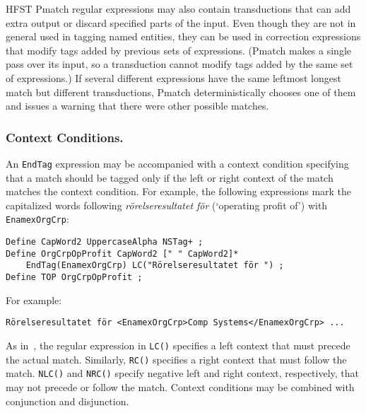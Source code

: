 \documentclass{llncs}
\begin{document}
HFST Pmatch regular expressions may also contain transductions that can add
extra output or discard specified parts of the input. Even though they
are not in general used in tagging named entities, they can be
used in correction expressions that modify tags added by previous sets
of expressions. (Pmatch makes a single pass over its input, so a
transduction cannot modify tags added by the same set of expressions.)
If several different expressions have the same leftmost longest match
but different transductions, Pmatch deterministically chooses one of
them and issues a warning that there were other possible matches.

\subsubsection{Context Conditions.}

An \texttt{EndTag} expression may be accompanied with a context
condition specifying that a match should be tagged only if the
left or right context of the match matches the context condition. For
example, the
following expressions mark the capitalized words following
\textit{rörelseresultatet för} (`operating profit of') with
\texttt{EnamexOrgCrp}:

\begin{verbatim}
Define CapWord2 UppercaseAlpha NSTag+ ;
Define OrgCrpOpProfit CapWord2 [" " CapWord2]*
    EndTag(EnamexOrgCrp) LC("Rörelseresultatet för ") ;
Define TOP OrgCrpOpProfit ;
\end{verbatim}

\noindent
For example:
\begin{verbatim}
Rörelseresultatet för <EnamexOrgCrp>Comp Systems</EnamexOrgCrp> ...
\end{verbatim}

As in~\cite{karttunen/2011}, the regular expression in \texttt{LC()}
specifies a left context that must precede the actual match.
Similarly, \texttt{RC()}
specifies a right context that must follow the match. \texttt{NLC()}
and \texttt{NRC()} specify negative left and right context,
respectively, that may not precede or follow the match.
Context conditions may be combined with conjunction and disjunction.


\end{document}

